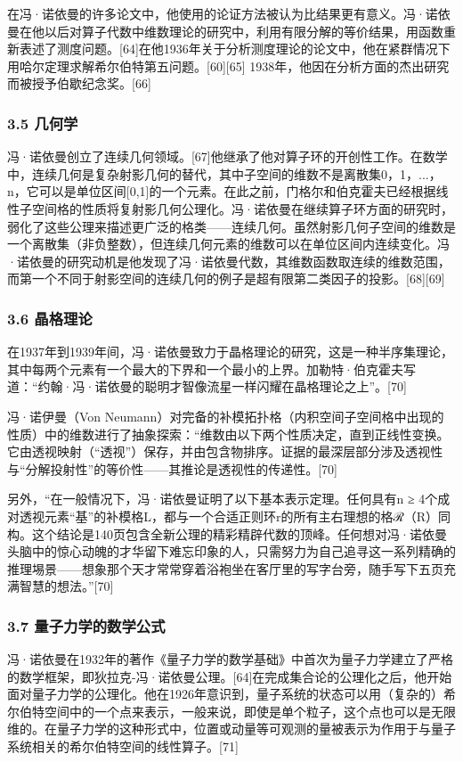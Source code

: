 在冯·诺依曼的许多论文中，他使用的论证方法被认为比结果更有意义。冯·诺依曼在他以后对算子代数中维数理论的研究中，利用有限分解的等价结果，用函数重新表述了测度问题。[64]在他1936年关于分析测度理论的论文中，他在紧群情况下用哈尔定理求解希尔伯特第五问题。[60][65] 1938年，他因在分析方面的杰出研究而被授予伯歇纪念奖。[66]
\subsubsection{3.5 几何学}
冯·诺依曼创立了连续几何领域。[67]他继承了他对算子环的开创性工作。在数学中，连续几何是复杂射影几何的替代，其中子空间的维数不是离散集0，1，...，n，它可以是单位区间[0,1]的一个元素。在此之前，门格尔和伯克霍夫已经根据线性子空间格的性质将复射影几何公理化。冯·诺依曼在继续算子环方面的研究时，弱化了这些公理来描述更广泛的格类——连续几何。虽然射影几何子空间的维数是一个离散集（非负整数），但连续几何元素的维数可以在单位区间内连续变化。冯·诺依曼的研究动机是他发现了冯·诺依曼代数，其维数函数取连续的维数范围，而第一个不同于射影空间的连续几何的例子是超有限第二类因子的投影。[68][69]
\subsubsection{3.6 晶格理论}
在1937年到1939年间，冯·诺依曼致力于晶格理论的研究，这是一种半序集理论，其中每两个元素有一个最大的下界和一个最小的上界。加勒特·伯克霍夫写道：“约翰·冯·诺依曼的聪明才智像流星一样闪耀在晶格理论之上”。[70]

冯·诺伊曼（Von Neumann）对完备的补模拓扑格（内积空间子空间格中出现的性质）中的维数进行了抽象探索：“维数由以下两个性质决定，直到正线性变换。它由透视映射（“透视”）保存，并由包含物排序。证据的最深层部分涉及透视性与“分解投射性”的等价性——其推论是透视性的传递性。[70]

另外，“在一般情况下，冯·诺依曼证明了以下基本表示定理。任何具有n ≥ 4个成对透视元素“基”的补模格L，都与一个合适正则环r的所有主右理想的格ℛ（R）同构。这个结论是140页包含全新公理的精彩精辟代数的顶峰。任何想对冯·诺依曼头脑中的惊心动魄的才华留下难忘印象的人，只需努力为自己追寻这一系列精确的推理埸景——想象那个天才常常穿着浴袍坐在客厅里的写字台旁，随手写下五页充满智慧的想法。”[70]
\subsubsection{3.7 量子力学的数学公式}
冯·诺依曼在1932年的著作《量子力学的数学基础》中首次为量子力学建立了严格的数学框架，即狄拉克-冯·诺依曼公理。[64]在完成集合论的公理化之后，他开始面对量子力学的公理化。他在1926年意识到，量子系统的状态可以用（复杂的）希尔伯特空间中的一个点来表示，一般来说，即使是单个粒子，这个点也可以是无限维的。在量子力学的这种形式中，位置或动量等可观测的量被表示为作用于与量子系统相关的希尔伯特空间的线性算子。[71]

